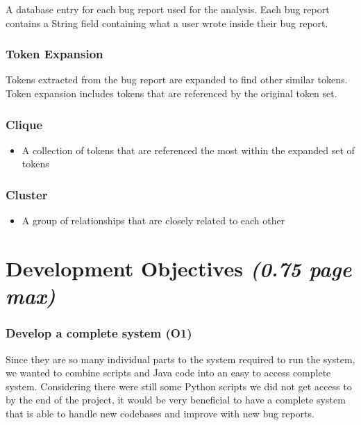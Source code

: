 \documentclass[12pt]{article}
\providecommand{\tightlist}{%
  \setlength{\itemsep}{0pt}\setlength{\parskip}{0pt}}
\begin{document}
A database entry for each bug report used for the analysis. Each bug
report contains a String field containing what a user wrote inside their
bug report.

\hypertarget{token-expansion}{%
\subsubsection{Token Expansion}\label{token-expansion}}

Tokens extracted from the bug report are expanded to find other similar
tokens. Token expansion includes tokens that are referenced by the
original token set.

\hypertarget{clique}{%
\subsubsection{Clique}\label{clique}}

\begin{itemize}
\tightlist
\item
  A collection of tokens that are referenced the most within the
  expanded set of tokens
\end{itemize}

\hypertarget{cluster}{%
\subsubsection{Cluster}\label{cluster}}

\begin{itemize}
\tightlist
\item
  A group of relationships that are closely related to each other
\end{itemize}

\hypertarget{development-objectives-0.75-page-max}{%
\section{\texorpdfstring{Development Objectives \emph{(0.75 page
max)}}{Development Objectives (0.75 page max)}}\label{development-objectives-0.75-page-max}}

\hypertarget{develop-a-complete-system-o1}{%
\subsubsection{Develop a complete system
(O1)}\label{develop-a-complete-system-o1}}

Since they are so many individual parts to the system required to run
the system, we wanted to combine scripts and Java code into an easy to
access complete system. Considering there were still some Python scripts
we did not get access to by the end of the project, it would be very
beneficial to have a complete system that is able to handle new
codebases and improve with new bug reports.
\end{document}

